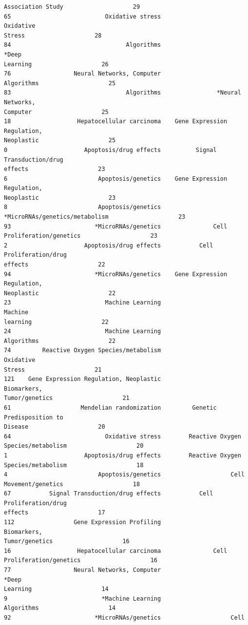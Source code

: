 \documentclass[11pt]{article}
\begin{document}
\begin{Verbatim}[commandchars=\\\{\}]
Association Study                    29
65                           Oxidative stress                          Oxidative
Stress                    28
84                                 Algorithms                            *Deep
Learning                    26
76                  Neural Networks, Computer
Algorithms                    25
83                                 Algorithms                *Neural Networks,
Computer                    25
18                   Hepatocellular carcinoma    Gene Expression Regulation,
Neoplastic                    25
0                      Apoptosis/drug effects          Signal Transduction/drug
effects                    23
6                          Apoptosis/genetics    Gene Expression Regulation,
Neoplastic                    23
8                          Apoptosis/genetics
*MicroRNAs/genetics/metabolism                    23
93                        *MicroRNAs/genetics               Cell
Proliferation/genetics                    23
2                      Apoptosis/drug effects           Cell Proliferation/drug
effects                    22
94                        *MicroRNAs/genetics    Gene Expression Regulation,
Neoplastic                    22
23                           Machine Learning                          Machine
learning                    22
24                           Machine Learning
Algorithms                    22
74         Reactive Oxygen Species/metabolism                          Oxidative
Stress                    21
121    Gene Expression Regulation, Neoplastic                Biomarkers,
Tumor/genetics                    21
61                    Mendelian randomization         Genetic Predisposition to
Disease                    20
64                           Oxidative stress        Reactive Oxygen
Species/metabolism                    20
1                      Apoptosis/drug effects        Reactive Oxygen
Species/metabolism                    18
4                          Apoptosis/genetics                    Cell
Movement/genetics                    18
67           Signal Transduction/drug effects           Cell Proliferation/drug
effects                    17
112                 Gene Expression Profiling                Biomarkers,
Tumor/genetics                    16
16                   Hepatocellular carcinoma               Cell
Proliferation/genetics                    16
77                  Neural Networks, Computer                            *Deep
Learning                    14
9                           *Machine Learning
Algorithms                    14
92                        *MicroRNAs/genetics                    Cell

\end{Verbatim}
\end{document}
